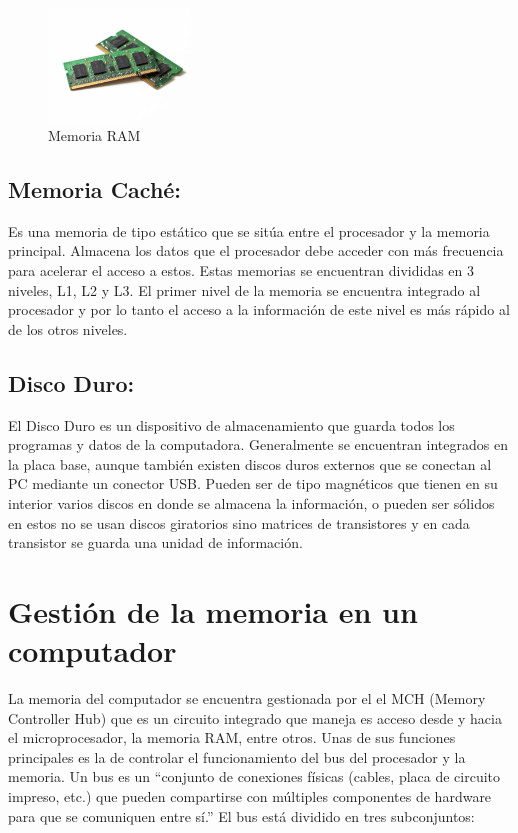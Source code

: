 \documentclass{article}
\begin{document}
\begin{figure}[h]
\includegraphics[width=4cm]{memoriaRAM.jpg}
\centering
\caption{Memoria RAM}
\end{figure}

\vfill

\subsection{Memoria Caché: } 
Es una memoria de tipo estático que se sitúa entre el procesador y la memoria principal. Almacena los datos que el procesador debe acceder con más frecuencia para acelerar el acceso a estos. Estas memorias se encuentran divididas en 3 niveles, L1, L2 y L3. El primer nivel de la memoria se encuentra integrado al procesador y por lo tanto el acceso a la información de este nivel es más rápido al de los otros niveles.

\subsection{Disco Duro: } 
El Disco Duro es un dispositivo de almacenamiento que guarda todos los programas y datos de la computadora.  Generalmente se encuentran integrados en la placa base, aunque también existen discos duros externos que se conectan al PC mediante un conector USB. Pueden ser de tipo magnéticos que tienen en su interior varios discos en donde se almacena la información, o pueden ser sólidos en estos no se usan discos giratorios sino matrices de transistores y en cada transistor se guarda una unidad de información.


\section{Gestión de la memoria en un computador}
La memoria del computador se encuentra gestionada por el el MCH (Memory Controller Hub)  que es un circuito integrado que maneja es acceso desde y hacia el microprocesador, la memoria RAM, entre otros. Unas de sus funciones principales es la de controlar el funcionamiento del bus del procesador y la memoria. Un bus es un “conjunto de conexiones físicas (cables, placa de circuito impreso, etc.) que pueden compartirse con múltiples componentes de hardware para que se comuniquen entre sí.”\cite{bus} El bus está dividido en tres subconjuntos:
\end{document}
